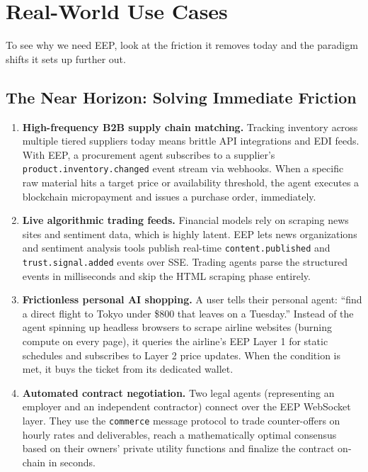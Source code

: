 \documentclass[12pt,a4paper]{article}
\begin{document}
\section{Real-World Use Cases}

To see why we need EEP, look at the friction it removes today and the paradigm shifts it sets up further out.

\subsection{The Near Horizon: Solving Immediate Friction}

\begin{enumerate}
    \item \textbf{High-frequency B2B supply chain matching.} Tracking inventory across multiple tiered suppliers today means brittle API integrations and EDI feeds. With EEP, a procurement agent subscribes to a supplier's \texttt{product.inventory.changed} event stream via webhooks. When a specific raw material hits a target price or availability threshold, the agent executes a blockchain micropayment and issues a purchase order, immediately.

    \item \textbf{Live algorithmic trading feeds.} Financial models rely on scraping news sites and sentiment data, which is highly latent. EEP lets news organizations and sentiment analysis tools publish real-time \texttt{content.published} and \texttt{trust.signal.added} events over SSE. Trading agents parse the structured events in milliseconds and skip the HTML scraping phase entirely.

    \item \textbf{Frictionless personal AI shopping.} A user tells their personal agent: ``find a direct flight to Tokyo under \$800 that leaves on a Tuesday.'' Instead of the agent spinning up headless browsers to scrape airline websites (burning compute on every page), it queries the airline's EEP Layer 1 for static schedules and subscribes to Layer 2 price updates. When the condition is met, it buys the ticket from its dedicated wallet.

    \item \textbf{Automated contract negotiation.} Two legal agents (representing an employer and an independent contractor) connect over the EEP WebSocket layer. They use the \texttt{commerce} message protocol to trade counter-offers on hourly rates and deliverables, reach a mathematically optimal consensus based on their owners' private utility functions and finalize the contract on-chain in seconds.


\end{enumerate}
\end{document}
